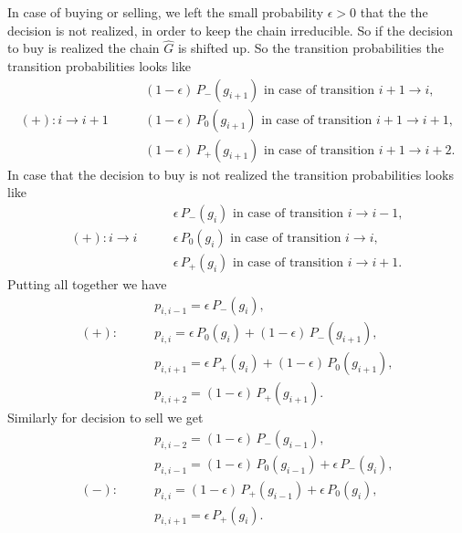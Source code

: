   In case of buying or selling, we left the small probability $\epsilon>0$ that the the decision is not realized, in   order to keep the chain irreducible. So if the decision to buy is realized the chain $\widehat{G}$ is shifted up. So the transition probabilities the transition probabilities looks like
  \begin{align*}
  &\qquad (1-\epsilon)\,P_{-}(g_{i+1}) \text{ in case of transition } i+1 \rightarrow i,\\
  (+):i\rightarrow i+1&\qquad (1-\epsilon)\,P_{0}(g_{i+1}) \text{ in case of transition } i+1 \rightarrow i+1,\\
  &\qquad (1-\epsilon)\,P_{+}(g_{i+1}) \text{ in case of transition } i+1 \rightarrow i+2.
  \end{align*}
  In case that the decision to buy is not realized the transition probabilities looks like
  \begin{align*}
  &\qquad \epsilon\,P_{-}(g_{i}) \text{ in case of transition } i \rightarrow i-1,\\
  (+):i\rightarrow i&\qquad \epsilon\,P_{0}(g_{i}) \text{ in case of transition } i \rightarrow i,\\
  &\qquad \epsilon\,P_{+}(g_{i}) \text{ in case of transition } i \rightarrow i+1.
  \end{align*}
  Putting all together we have
  \begin{align*}
  &\qquad p_{i,i-1}=\epsilon\,P_{-}(g_i),\\
  (+):&\qquad p_{i,i}=\epsilon\,P_{0}(g_i)+(1-\epsilon)\,P_{-}(g_{i+1}),\\
  &\qquad p_{i,i+1}=\epsilon\,P_{+}(g_i)+(1-\epsilon)\,P_{0}(g_{i+1}),\\
  &\qquad p_{i,i+2}=(1-\epsilon)\,P_{+}(g_{i+1}).
  \end{align*} 
  Similarly for decision to sell we get
  \begin{align*}
  &\qquad p_{i,i-2}=(1-\epsilon)\,P_{-}(g_{i-1}),\\
  &\qquad p_{i,i-1}=(1-\epsilon)\,P_{0}(g_{i-1})+\epsilon\,P_{-}(g_{i}),\\
  (-):&\qquad p_{i,i}=(1-\epsilon)\,P_{+}(g_{i-1})+\epsilon\,P_{0}(g_{i}),\\
  &\qquad p_{i,i+1}=\epsilon\,P_{+}(g_{i}).
  \end{align*}

